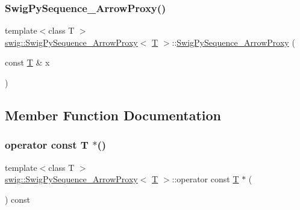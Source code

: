 \subsubsection{\texorpdfstring{Swig\+Py\+Sequence\+\_\+\+Arrow\+Proxy()}{SwigPySequence\_ArrowProxy()}}
{\footnotesize\ttfamily template$<$class T $>$ \\
\hyperlink{structswig_1_1_swig_py_sequence___arrow_proxy}{swig\+::\+Swig\+Py\+Sequence\+\_\+\+Arrow\+Proxy}$<$ \hyperlink{fmt_8h_a0acb682b8260ab1c60b918599864e2e5}{T} $>$\+::\hyperlink{structswig_1_1_swig_py_sequence___arrow_proxy}{Swig\+Py\+Sequence\+\_\+\+Arrow\+Proxy} (\begin{DoxyParamCaption}\item[{const \hyperlink{fmt_8h_a0acb682b8260ab1c60b918599864e2e5}{T} \&}]{x }\end{DoxyParamCaption})\hspace{0.3cm}{\ttfamily [inline]}}



\subsection{Member Function Documentation}
\mbox{\label{structswig_1_1_swig_py_sequence___arrow_proxy_a6e0e0a0f3bb533b48aa05bd94165929b}} 
\subsubsection{\texorpdfstring{operator const T $\ast$()}{operator const T *()}}
{\footnotesize\ttfamily template$<$class T $>$ \\
\hyperlink{structswig_1_1_swig_py_sequence___arrow_proxy}{swig\+::\+Swig\+Py\+Sequence\+\_\+\+Arrow\+Proxy}$<$ \hyperlink{fmt_8h_a0acb682b8260ab1c60b918599864e2e5}{T} $>$\+::operator const \hyperlink{fmt_8h_a0acb682b8260ab1c60b918599864e2e5}{T} $\ast$ (\begin{DoxyParamCaption}{ }\end{DoxyParamCaption}) const\hspace{0.3cm}{\ttfamily [inline]}}

\mbox{\label{structswig_1_1_swig_py_sequence___arrow_proxy_a8f9c6d4d0feb5cf17f8cb06e30f5721e}} 
